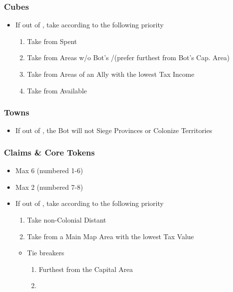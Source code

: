 \documentclass[10pt]{article}
\begin{document}
\subsubsection*{Cubes}
\begin{itemize}
	\item If out of \cubes, take according to the following priority
	\begin{enumerate}
		\item Take \cubes from Spent \botpower
		\item Take \influence from Areas w/o Bot's \alliance/\marriage (prefer furthest from Bot's Cap. Area)
		\item Take from Areas of an Ally with the lowest Tax Income
		\item Take from Available \botpower
	\end{enumerate}
\end{itemize}

\subsubsection*{Towns}
\begin{itemize}
	\item If out of \towns, the Bot will not Siege Provinces or Colonize Territories
\end{itemize}

\subsubsection*{Claims \& Core Tokens}
\begin{itemize}
	\item Max 6 \claims (numbered 1-6)
	\item Max 2 \cores (numbered 7-8)
	\item If out of \claims, take according to the following priority
	\begin{enumerate}
		\item Take non-Colonial Distant \claims
		\item Take \claims from a Main Map Area with the lowest Tax Value
	\end{enumerate}
	\begin{itemize}
		\item Tie breakers
		\begin{enumerate}
			\item Furthest from the Capital Area
			\item \az
		\end{enumerate}
	\end{itemize}
\end{itemize}
\end{document}
